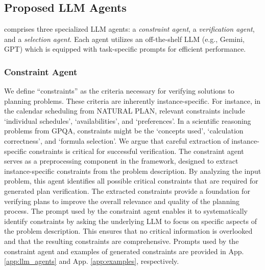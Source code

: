 \section{\plangen{}}
\label{sec:method}


\subsection{Proposed LLM Agents}

\plangen{} comprises three specialized LLM agents: a \textit{constraint agent}, a \textit{verification agent}, and a \textit{selection agent}. Each agent utilizes an off-the-shelf LLM (e.g., Gemini, GPT) which is equipped with task-specific prompts for efficient performance.

\subsubsection{Constraint Agent}
\label{subsec:constraint}

We define ``constraints'' as the criteria necessary for verifying solutions to planning problems. These criteria are inherently instance-specific. For instance, in the calendar scheduling from NATURAL PLAN, relevant constraints include `individual schedules', `availabilities', and `preferences'. In a scientific reasoning problems from GPQA, constraints might be the `concepts used', `calculation correctness', and `formula selection'. We argue that careful extraction of instance-specific constraints is critical for successful verification. The constraint agent serves as a preprocessing component in the framework, designed to extract instance-specific constraints from the problem description. By analyzing the input problem, this agent identifies all possible critical constraints that are required for generated plan verification. The extracted constraints provide a foundation for verifying plans to improve the overall relevance and quality of the planning process. The prompt used by the constraint agent enables it to systematically identify constraints by asking the underlying LLM to focus on specific aspects of the problem description. This ensures that no critical information is overlooked and that the resulting constraints are comprehensive. Prompts used by the constraint agent and examples of generated constraints are provided in App. \ref{app:llm_agents} and App. \ref{app:examples}, respectively.

